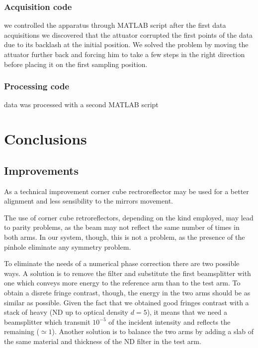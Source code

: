 \documentclass[12pt,a4paper,twoside]{article}
\begin{document}
\subsubsection*{Acquisition code}
we controlled the apparatus through MATLAB script
after the first data acquisitions we discovered that the attuator corrupted the first points of the data due to its backlash at the initial position.
We solved the problem by moving the attuator further back and forcing him to take a few steps in the right direction before placing it on the first sampling position.

\subsubsection*{Processing code}
data was processed with a second MATLAB script

\clearpage
\section{Conclusions}
\subsection{Improvements}
As a technical improvement corner cube rectroreflector may be used for a better alignment and less sensibility to the mirrors movement.

The use of corner cube retroreflectors, depending on the kind employed, may lead to parity problems, as the beam may not reflect the same number of times in both arms.
In our system, though, this is not a problem, as the presence of the pinhole eliminate any symmetry problem.

To eliminate the needs of a numerical phase correction there are two possible ways.
A solution is to remove the filter and substitute the first beamsplitter with one which conveys more energy to the reference arm than to the test arm.
To obtain a disrete fringe contrast, though, the energy in the two arms should be as similar as possible.
Given the fact that we obtained good fringes contrast with a stack of heavy (ND up to optical density $d=5$), it means that we need a beamsplitter which transmit $10^{-5}$ of the incident intensity and reflects the remaining ($\simeq 1$).
Another solution is to balance the two arms by adding a slab of the same material and thickness of the ND filter in the test arm.
\end{document}
